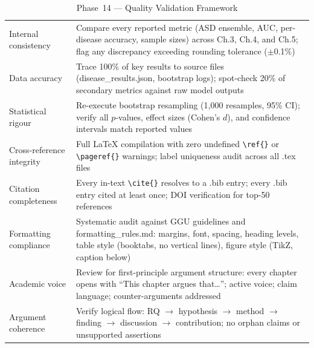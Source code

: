 \begingroup\singlespacing\tablefontsize\tablestripes
\begin{xltabular}{\textwidth}{@{} p{3.2cm} X @{}}
\caption{Phase~14 --- Quality Validation Framework}
\label{tab:phase14_quality}\\
\toprule
{} &  \\
\midrule
\endfirsthead
\endhead
\bottomrule
\endlastfoot
Internal consistency      & Compare every reported metric (ASD ensemble, AUC, per-disease accuracy, sample sizes) across Ch.3, Ch.4, and Ch.5; flag any discrepancy exceeding rounding tolerance ($\pm$0.1\%) \\
\addlinespace
Data accuracy             & Trace 100\% of key results to source files (disease\_results.json, bootstrap logs); spot-check 20\% of secondary metrics against raw model outputs \\
\addlinespace
Statistical rigour        & Re-execute bootstrap resampling (1,000 resamples, 95\% CI); verify all $p$-values, effect sizes (Cohen's $d$), and confidence intervals match reported values \\
\addlinespace
Cross-reference integrity & Full LaTeX compilation with zero undefined \texttt{\textbackslash ref\{\}} or \texttt{\textbackslash pageref\{\}} warnings; label uniqueness audit across all .tex files \\
\addlinespace
Citation completeness     & Every in-text \texttt{\textbackslash cite\{\}} resolves to a .bib entry; every .bib entry cited at least once; DOI verification for top-50 references \\
\addlinespace
Formatting compliance     & Systematic audit against GGU guidelines and formatting\_rules.md: margins, font, spacing, heading levels, table style (booktabs, no vertical lines), figure style (TikZ, caption below) \\
\addlinespace
Academic voice            & Review for first-principle argument structure: every chapter opens with ``This chapter argues that\ldots''; active voice; claim language; counter-arguments addressed \\
\addlinespace
Argument coherence        & Verify logical flow: RQ $\rightarrow$ hypothesis $\rightarrow$ method $\rightarrow$ finding $\rightarrow$ discussion $\rightarrow$ contribution; no orphan claims or unsupported assertions \\
\end{xltabular}
\endgroup

\vspace{1.5em}

